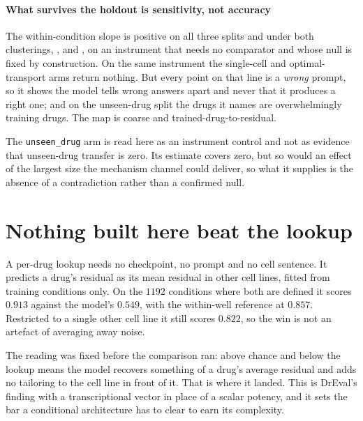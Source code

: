\paragraph{What survives the holdout is sensitivity, not accuracy} The
within-condition slope is positive on all three splits and under both
clusterings, ,  and
, on an instrument that needs no comparator and whose
null is fixed by construction. On the same instrument the single-cell and
optimal-transport arms return nothing. But every point on that line is a
\emph{wrong} prompt, so it shows the model tells wrong answers apart and never
that it produces a right one; and on the unseen-drug split the drugs it names are
overwhelmingly training drugs. The map is coarse and trained-drug-to-residual.

\begin{scopelimit}
The \texttt{unseen\_drug} arm is read here as an instrument control and not as
evidence that unseen-drug transfer is zero. Its estimate covers zero, but so
would an effect of the largest size the mechanism channel could deliver, so what
it supplies is the absence of a contradiction rather than a confirmed null.
\end{scopelimit}

\section{Nothing built here beat the lookup}

A per-drug lookup needs no checkpoint, no prompt and no cell
sentence. It predicts a drug's residual as its mean residual in other cell
lines, fitted from training conditions only. On the $\num{1192}$ conditions where
both are defined it scores $0.913$ against the model's $0.549$, with the
within-well reference at $0.857$. Restricted to a single other cell line it still
scores $0.822$, so the win is not an artefact of averaging away noise.

The reading was fixed before the comparison ran: above chance and below the
lookup means the model recovers something of a drug's average residual and adds
no tailoring to the cell line in front of it. That is where it landed. This is
DrEval's finding with a transcriptional vector in place of a scalar potency, and
it sets the bar a conditional architecture has to clear to earn its complexity.


